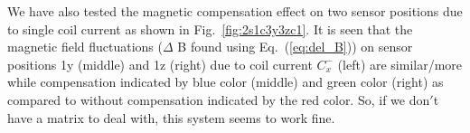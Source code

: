 We have also tested the magnetic compensation effect on two sensor positions due to single coil current as shown in Fig.~\ref{fig:2s1c3y3zc1}. It is seen that the magnetic field fluctuations ($\Delta$ B found using Eq.~(\ref{eq:del_B})) on sensor positions 1y (middle) and 1z (right) due to coil current $C_x^-$ (left) are similar/more while compensation indicated by blue color (middle) and green color (right) as compared to without compensation indicated by the red color. So, if we don$'$t have a matrix to deal with, this system seems to work fine.















